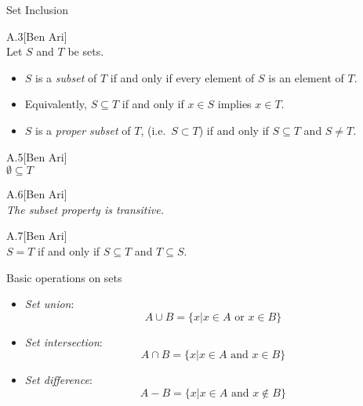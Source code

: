 \begin{slide}[bm=,toc=]{Set Inclusion}
\begin{defn}{A.3}[Ben Ari]~\\
\pause 
Let $S$ and $T$ be sets.
\begin{itemize}
\item<3-> $S$ is a \emph{subset} of $T$ if and only if every element of $S$ is an
      element of $T$.
\item<4-> Equivalently, $S \subseteq T$ if and only if $x \in S$ implies $x \in T$.
\item<5-> $S$ is a \emph{proper subset} of $T$, (i.e.\ $S \subset T$) if and only
      if $S \subseteq T$ and $S \neq T$.
\end{itemize}
\end{defn}
\pause[4]
\begin{thm}{A.5}[Ben Ari]~\\
$\emptyset \subseteq T$
\end{thm}
\vspace{1.5mm}
\pause
\begin{thm}{A.6}[Ben Ari]~\\
\emph{The subset property is transitive.}
\end{thm}
\vspace{1.5mm}
\pause
\begin{thm}{A.7}[Ben Ari]~\\
$S = T$ if and only if $S \subseteq T$ and $T \subseteq S$.
\end{thm}



\end{slide}

\begin{slide}[bm=,toc=]{Basic operations on sets}
\begin{itemize}
   \item<2-> \emph{Set union}: 
   \pause[2]
   \[
     A \cup B = \{x|x \in A \text{ or } x \in B\}
   \]

   \item<4-> \emph{Set intersection}: 
   \pause[2]
   \[
     A \cap B = \{x|x \in A \text{ and } x \in B\}
   \]

   \item<6-> \emph{Set difference}: 
   \pause[2]
   \[
     A - B = \{x|x \in A \text{ and } x \notin B\}
   \]

\end{itemize}
\end{slide}

